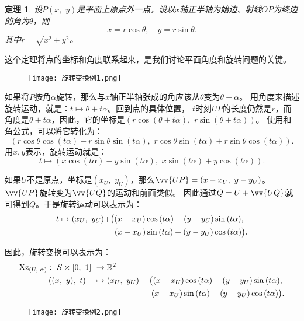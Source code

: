 \documentclass[12pt,UTF8]{ctexbook}
\newtheorem{tm}{定理}[section]
\begin{document}
\begin{tm}
    设$P(x,\,\,y)$是平面上原点外一点，设以$x$轴正半轴为始边、射线$OP$为终边的角为$\theta$，则
    $$ x = r\cos{\theta},\quad y = r\sin{\theta}.$$
    其中$r = \sqrt{x^2 + y^2}$。
\end{tm}
这个定理将点的坐标和角度联系起来，是我们讨论平面角度和旋转问题的关键。 

\begin{wrapfigure}[7]{r}{0.36\textwidth} %
    \vspace{-40pt}
    \flushright
    \texttt{[image: 旋转变换例1.png]}
\end{wrapfigure}

如果将$P$按角$\alpha$旋转，那么与$x$轴正半轴张成的角应该从$\theta$变为$\theta + \alpha$。
用角度来描述旋转运动，就是：$t \mapsto \theta + t\alpha$。回到点的具体位置，
$t$时刻$UP$的长度仍然是$r$，而角度是$\theta + t\alpha$，因此，它的坐标是$(r\cos{(\theta + t\alpha)},\,\,r\sin{(\theta + t\alpha)})$。
使用和角公式，可以将它转化为：
$$(r\cos{\theta}\cos{(t\alpha)} - r\sin{\theta}\sin{(t\alpha)},\,\,r\cos{\theta}\sin{(t\alpha)} + r\sin{\theta}\cos{(t\alpha)}).$$
用$x,y$表示，旋转运动就是：
$$ t \mapsto \left(x\cos{(t\alpha)} - y\sin{(t\alpha)}, \,\,x\sin{(t\alpha)} + y\cos{(t\alpha)}\right).$$

如果$U$不是原点，坐标是$(x_U, \,\,y_U)$，那么$\vv{UP} = (x - x_U, \,\, y - y_U)$。$\vv{UP}$旋转变为$\vv{UQ}$的运动和前面类似。
因此通过$Q = U + \vv{UQ}$就可得到$Q$。于是旋转运动可以表示为：
\begin{align}
    t \mapsto (x_U,\,\,y_U) + &\big((x - x_U)\cos{(t\alpha)} - (y - y_U)\sin{(t\alpha)},\notag \\
    &\,\,\,(x - x_U)\sin{(t\alpha)} + (y - y_U)\cos{(t\alpha)}\big).\notag
\end{align}

因此，旋转变换可以表示为：
\begin{align}
    \mathrm{Xz}_{(U,\,\,\alpha)}: \,\, S\times[0,\,\,1] \,\,&\rightarrow \mathbb{R}^2 \notag \\
    ((x,\,\,y),\,\, t) \quad &\mapsto (x_U,\,\,y_U)+\big((x - x_U)\cos{(t\alpha)} - (y - y_U)\sin{(t\alpha)},\notag \\
    &\qquad\qquad\qquad\quad(x - x_U)\sin{(t\alpha)} + (y - y_U)\cos{(t\alpha)}\big). \notag
\end{align}

\begin{wrapfigure}[7]{r}{0.42\textwidth} %
    \vspace{-22pt}
    \flushright
    \texttt{[image: 旋转变换例2.png]}
\end{wrapfigure}
\end{document}
